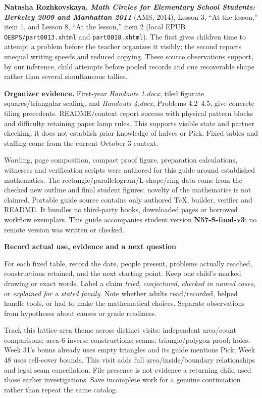 \documentclass[letterpaper,11pt]{article}
\newcommand{\subhead}[1]{\vspace{2pt}\textbf{#1}\par}
\begin{document}
\textbf{Natasha Rozhkovskaya, \emph{Math Circles for Elementary School Students: Berkeley 2009 and Manhattan 2011}} (AMS, 2014), Lesson 3, ``At the lesson,'' item 1, and Lesson 8, ``At the lesson,'' item 2 (local EPUB \nolinkurl{OEBPS/part0013.xhtml} and \nolinkurl{part0018.xhtml}). The first gives children time to attempt a problem before the teacher organizes it visibly; the second reports unequal writing speeds and reduced copying. These source observations support, by our inference, child attempts before pooled records and one recoverable shape rather than several simultaneous tallies.

\textbf{Organizer evidence.} First-year \emph{Handouts 1.docx}, tiled figurate squares/triangular scaling, and \emph{Handouts 4.docx}, Problems 4.2--4.5, give concrete tiling precedents. README/context report success with physical pattern blocks and difficulty retaining paper lamp rules. This supports visible state and partner checking; it does not establish prior knowledge of halves or Pick. Fixed tables and staffing come from the current October 3 context.

Wording, page composition, compact proof figure, preparation calculations, witnesses and verification scripts were authored for this guide around established mathematics. The rectangle/parallelogram/L-shape/ring data come from the checked new outline and final student figures; novelty of the mathematics is not claimed. Portable guide source contains only authored TeX, builder, verifier and README. It bundles no third-party books, downloaded pages or borrowed workflow exemplars. This guide accompanies student version \textbf{N57-S-final-v3}; no remote version was written or checked.

\subhead{Record actual use, evidence and a next question}
For each fixed table, record the date, people present, problems actually reached, constructions retained, and the next starting point. Keep one child's marked drawing or exact words. Label a claim \emph{tried}, \emph{conjectured}, \emph{checked in named cases}, or \emph{explained for a stated family}. Note whether adults read/recorded, helped handle tools, or had to make the mathematical choices. Separate observations from hypotheses about causes or grade readiness.

Track this lattice-area theme across distinct visits: independent area/count comparisons; area-6 inverse constructions; seams; triangle/polygon proof; holes. Week 31's bonus already uses empty triangles and its guide mentions Pick; Week 48 uses cell-cover bounds. This visit adds full area/inside/boundary relationships and legal seam cancellation. File presence is not evidence a returning child used those earlier investigations. Save incomplete work for a genuine continuation rather than repeat the same catalog.
\end{document}
